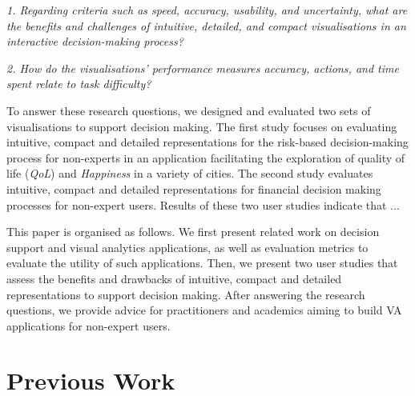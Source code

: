 \documentclass[final,5p,times,twocolumn,authoryear]{elsarticle}
\begin{document}
\emph{1. Regarding criteria such as speed, accuracy, usability, and uncertainty, what are the benefits and challenges of intuitive, detailed, and compact visualisations in an interactive decision-making process?}

\emph{2. How do the visualisations' performance measures accuracy, actions, and time spent relate to task difficulty?}

To answer these research questions, we designed and evaluated two sets of visualisations to support decision making. The first study focuses on evaluating intuitive, compact and detailed representations for the risk-based decision-making process for non-experts in an application facilitating the exploration of quality of life (\emph{QoL}) and \emph{Happiness} in a variety of cities. The second study evaluates intuitive, compact and detailed representations for financial decision making processes for non-expert users. Results of these two user studies indicate that ...

This paper is organised as follows. We first present related work on decision support and visual analytics applications, as well as evaluation metrics to evaluate the utility of such applications. Then, we present two user studies that assess the benefits and drawbacks of intuitive, compact and detailed representations to support decision making.  After answering the research questions, we provide advice for practitioners and academics aiming to build VA applications for non-expert users.

\section{Previous Work} %
\label{sub:previous_work}



\end{document}
